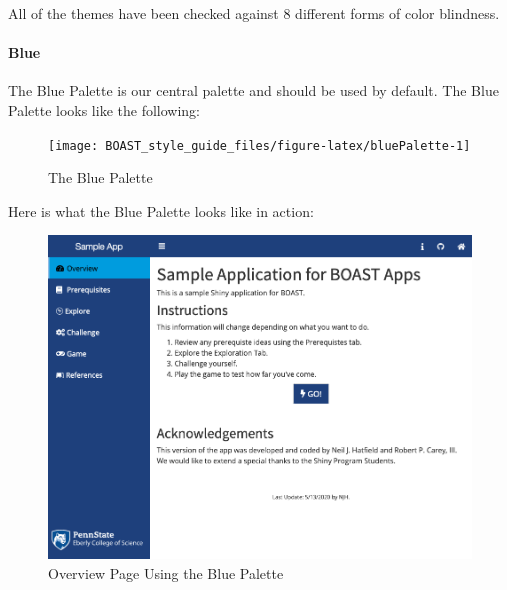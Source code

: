 \documentclass[
]{book}
\begin{document}
All of the themes have been checked against 8 different forms of color blindness.

\hypertarget{blue}{%
\paragraph{Blue}\label{blue}}

The Blue Palette is our central palette and should be used by default. The Blue Palette looks like the following:

\begin{figure}

{\centering \texttt{[image: BOAST\_style\_guide\_files/figure-latex/bluePalette-1]} 

}

\caption{The Blue Palette}\label{fig:bluePalette}
\end{figure}

Here is what the Blue Palette looks like in action:

\begin{figure}

{\centering \includegraphics[width=13.26in]{images/blueOverview} 

}

\caption{Overview Page Using the Blue Palette}\label{fig:blueAction1}
\end{figure}
\end{document}
